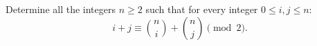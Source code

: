 Determine all the integers $n\geq 2$ such that for every integer $0 \leq i, j \leq n$:
$$i+j \equiv \binom{n}{i} + \binom{n}{j} \pmod{2}.$$
